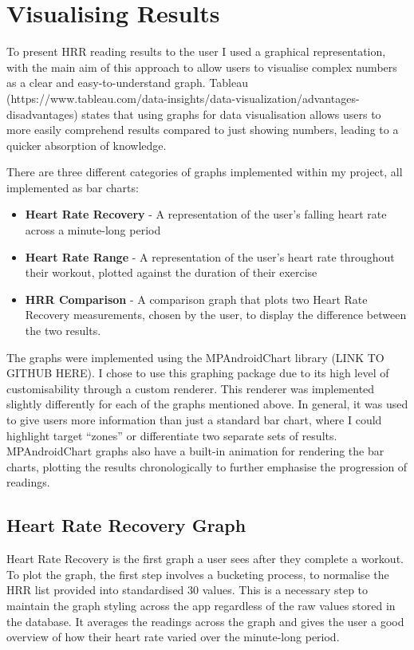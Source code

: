 \documentclass{l4proj}
\begin{document}
\section{Visualising Results}
\label{sec:visualiseresults}

To present HRR reading results to the user I used a graphical representation, with the main aim of this approach to allow users to visualise complex numbers as a clear and easy-to-understand graph. Tableau (https://www.tableau.com/data-insights/data-visualization/advantages-disadvantages) states that using graphs for data visualisation allows users to more easily comprehend results compared to just showing numbers, leading to a quicker absorption of knowledge.

There are three different categories of graphs implemented within my project, all implemented as bar charts:

\begin{itemize}
    \item \textbf{Heart Rate Recovery} - A representation of the user’s falling heart rate across a minute-long period
    \item \textbf{Heart Rate Range} - A representation of the user’s heart rate throughout their workout, plotted against the duration of their exercise
    \item \textbf{HRR Comparison} - A comparison graph that plots two Heart Rate Recovery measurements, chosen by the user, to display the difference between the two results.
\end{itemize}

The graphs were implemented using the MPAndroidChart library (LINK TO GITHUB HERE). I chose to use this graphing package due to its high level of customisability through a custom renderer. This renderer was implemented slightly differently for each of the graphs mentioned above. In general, it was used to give users more information than just a standard bar chart, where I could highlight target “zones” or differentiate two separate sets of results. MPAndroidChart graphs also have a built-in animation for rendering the bar charts, plotting the results chronologically to further emphasise the progression of readings. 

\subsection{Heart Rate Recovery Graph}
\label{sec:hrrgraph}

Heart Rate Recovery is the first graph a user sees after they complete a workout. To plot the graph, the first step involves a bucketing process, to normalise the HRR list provided into standardised 30 values. This is a necessary step to maintain the graph styling across the app regardless of the raw values stored in the database. It averages the readings across the graph and gives the user a good overview of how their heart rate varied over the minute-long period. 
\end{document}
